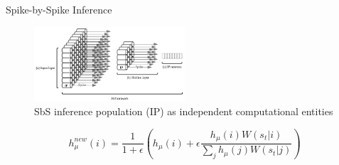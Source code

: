 \begin{frame}{Spike-by-Spike Inference}
	\begin{figure}
		\centering
		\includegraphics[width=0.5\textwidth]{../chapters/sbs_accelerator/figures/SbS_layer.pdf}
		\caption{SbS inference population (IP) as independent computational entities}
	\end{figure}
	
	
	{
		\[
		h_\mu^{new}(i) = \frac{1}{1+\epsilon} \left(h_\mu(i) + \epsilon \frac{h_\mu(i) W(s_t|i) }{\sum_j h_\mu(j) W(s_t|j)} \right) 
		\]
	}
\end{frame}

